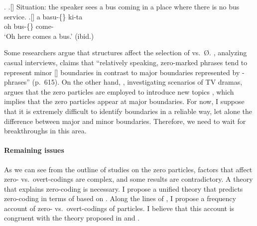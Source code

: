 \ex.
 \a.[] Situation: the speaker sees a bus coming in a place
       where there is no bus service.
 \bg.[] a basu-\{\} ki-ta \\
      oh bus-\{\} come- \\
      `Oh here comes a bus.'
      \hfill{(ibid.)}


Some researchers argue that
 structures affect the selection of  vs.~{\O}.
, analyzing casual interviews,
claims that
``relatively speaking, zero-marked phrases tend to represent
minor [] boundaries in contrast to major boundaries represented
by -phrases'' (p.~615).
On the other hand,
,
investigating scenarios of TV dramas,
argues that the zero particles are employed to introduce new topics
\cite[see also][]{niwa06},
which implies that the zero particles appear at major  boundaries.
For now,
I suppose that it is extremely difficult to identify  boundaries in a reliable way,
let alone the difference between major and minor boundaries.
Therefore, we need to wait for breakthroughs in this area.

\paragraph{Remaining issues}

As we can see from the outline of studies on the zero particles,
factors that affect zero- vs.~overt-codings are complex,
and some results are contradictory.
A theory that explains zero-coding is necessary.
I propose a unified theory that predicts zero-coding in terms of
based on .
Along the lines of ,
I propose a frequency account of zero- vs.~overt-codings of particles.
I believe that this account is congruent with
the theory proposed in  and .




